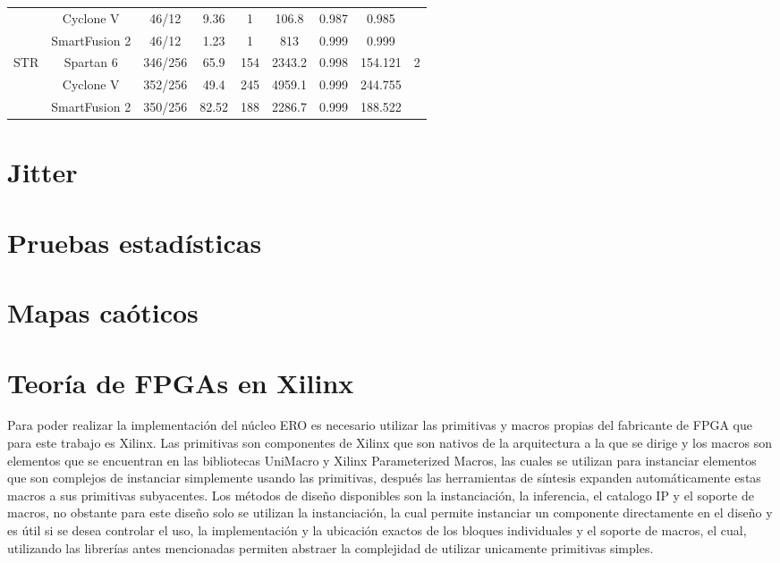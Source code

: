 \begin{table}[htbp]
{\begin{tabular}{|c|c|c|c|c|c|c|c|c|}
          & Cyclone V & 46/12 & 9.36  & 1     & 106.8 & 0.987 & 0.985 &  \\
          & SmartFusion 2 & 46/12 & 1.23  & 1     & 813   & 0.999 & 0.999 &  \\
    \hline
    \multirow{3}[2]{*}{STR} & Spartan 6 & 346/256 & 65.9  & 154   & 2343.2 & 0.998 & 154.121 & \multirow{3}[2]{*}{2} \\
          & Cyclone V & 352/256 & 49.4  & 245   & 4959.1 & 0.999 & 244.755 &  \\
          & SmartFusion 2 & 350/256 & 82.52 & 188   & 2286.7 & 0.999 & 188.522 &  \\
    \hline
    \end{tabular}%
}
  \label{tab:addlabel}%

\end{table}%



    \section{Jitter}
    \section{Pruebas estadísticas}
    \section{Mapas caóticos}

    \cite{Sprott2003}

    \cite{Strogatz1994}

    \cite{Gleick1987}




    \section{Teoría de FPGAs en Xilinx}
        Para poder realizar la implementación del núcleo ERO es necesario utilizar las primitivas y macros propias del fabricante de FPGA que para este trabajo es Xilinx. Las primitivas son componentes de Xilinx que son nativos de la arquitectura a la que se dirige y los macros son elementos que se encuentran en las bibliotecas UniMacro y Xilinx Parameterized Macros, las cuales se utilizan para instanciar elementos que son complejos de instanciar simplemente usando las primitivas, después las herramientas de síntesis expanden automáticamente estas macros a sus primitivas subyacentes. Los métodos de diseño disponibles son la instanciación, la inferencia, el catalogo IP y el soporte de macros, no obstante para este diseño solo se utilizan la instanciación, la cual permite instanciar un componente directamente en el diseño y es útil si se desea controlar el uso, la implementación y la ubicación exactos de los bloques individuales y el soporte de macros, el cual, utilizando las librerías antes mencionadas permiten abstraer la complejidad de utilizar unicamente primitivas simples.

